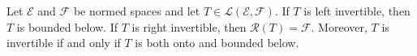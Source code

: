 Let $\mathcal{E}$ and $\mathcal{F}$ be normed spaces and let $T \in \mathcal{L}(\mathcal{E}, \mathcal{F})$. If $T$ is left invertible, then $T$ is bounded below. If $T$ is right invertible, then $\mathcal{R}(T) = \mathcal{F}$. Moreover, $T$ is invertible if and only if $T$ is both onto and bounded below.
